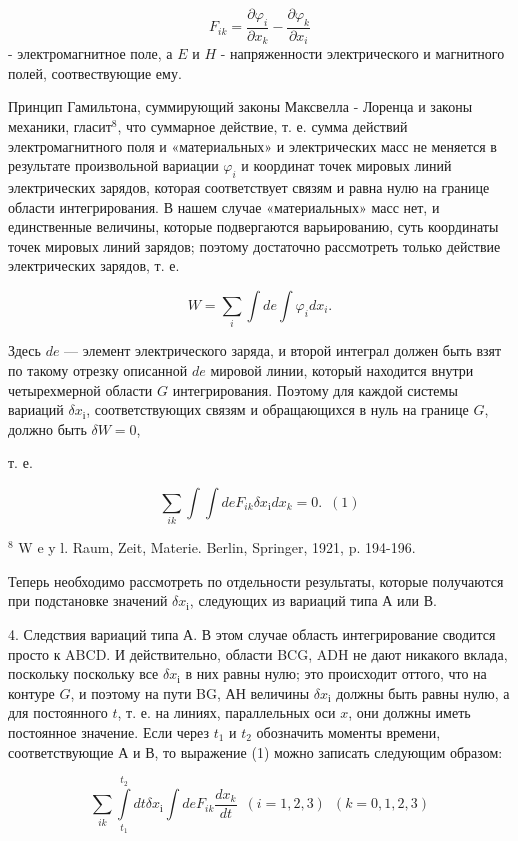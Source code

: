 \documentclass[11pt]{article}
\begin{document}
\[F_{ik}=\frac{\partial \varphi_i}{\partial x_k} - \frac{\partial \varphi_k}{\partial x_i}\]
- электромагнитное поле, а \(E\) и \(H\) - напряженности электрического
и магнитного полей, соотвествующие ему.

    Принцип Гамильтона, суммирующий законы Максвелла - Лоренца и законы
механики, гласит\(^8\), что суммарное действие, т. е. сумма действий
электромагнитного поля и «материальных» и электрических масс не меняется
в результате произвольной вариации \(\varphi_i\) и координат точек
мировых линий электрических зарядов, которая соответствует связям и
равна нулю на границе области интегрирования. В нашем случае
«материальных» масс нет, и единственные величины, которые подвергаются
варьированию, суть координаты точек мировых линий зарядов; поэтому
достаточно рассмотреть только действие электрических зарядов, т. е.

\[W=\sum_i\int de \int \varphi_i dx_i.\]

    Здесь \(de\) --- элемент электрического заряда, и второй интеграл должен
быть взят по такому отрезку описанной \(de\) мировой линии, который
находится внутри четырехмерной области \(G\) интегрирования. Поэтому для
каждой системы вариаций \(\delta {{x}_{і}}\), соответствующих связям и
обращающихся в нуль на границе \(G\), должно быть \(\delta W = 0\),

    т. е.

\[\sum_{ik} \int \int de F_{ik} \delta {{x}_{і}} dx_{k} = 0. \,\,\,(1)\]

    \(^8\) W e y l. Raum, Zeit, Materie. Berlin, Springer, 1921, p. 194-196.

    Теперь необходимо рассмотреть по отдельности результаты, которые
получаются при подстановке значений \(\delta {{x}_{і}}\), следующих из
вариаций типа А или В.

    4. Следствия вариаций типа А. В этом случае область интегрирование
сводится просто к ABCD. И действительно, области BCG, ADH не дают
никакого вклада, поскольку поскольку все \(\delta {{x}_{і}}\) в них равны
нулю; это происходит оттого, что на контуре \(G\), и поэтому на пути BG,
АН величины \(\delta {{x}_{і}}\) должны быть равны нулю, а для постоянного
\(t\), т. е. на линиях, параллельных оси \(x\), они должны иметь
постоянное значение. Если через \(t_1\) и \(t_2\) обозначить моменты
времени, соответствующие А и В, то выражение (1) можно записать
следующим образом:

\[\sum_{ik} \int\limits_{t_1}^{t_2} dt \delta {{x}_{і}} \int de F_{ik}  \frac{dx_{k}}{dt} \,\,\,(i = 1,2,3)\,\,\,(k = 0,1,2,3)\]
\end{document}

